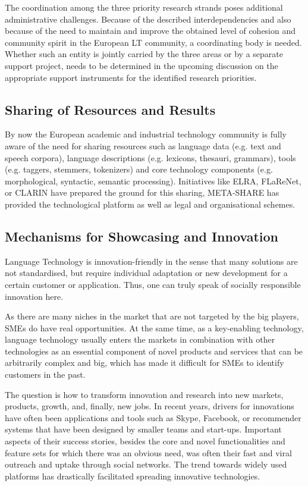 \documentclass[10pt, plain]{../../metanetpaper}
\begin{document}
\begin{multicols}{2}
The coordination among the three priority research strands poses additional administrative challenges. Because of the described interdependencies and also because of the need to maintain and improve the obtained level of cohesion and community spirit in the European LT community, a coordinating body is needed. Whether such an entity is jointly carried by the three areas or by a separate support project, needs to be determined in the upcoming discussion on the appropriate support instruments for the identified research priorities.

\subsection{Sharing of Resources and Results}
\label{sec:sharing-resources-and-results}

By now the European academic and industrial technology community is fully aware of the need for sharing resources such as language data (e.g. text and speech corpora), language descriptions (e.g. lexicons, thesauri, grammars), tools (e.g. taggers, stemmers, tokenizers) and core technology components (e.g. morphological, syntactic, semantic processing). Initiatives like ELRA, FLaReNet, or CLARIN have prepared the ground for this sharing, META-SHARE has provided the technological platform as well as legal and organisational schemes.


\subsection{Mechanisms for Showcasing and Innovation}
\label{sec:powerf-mech-showcasing-and-innovation}

Language Technology is innovation-friendly in the sense that many solutions are not standardised, but require individual adaptation or new development for a certain customer or application. Thus, one can truly speak of socially responsible innovation here.

As there are many niches in the market that are not targeted by the big players, SMEs do have real opportunities. At the same time, as a key-enabling technology, language technology usually enters the markets in combination with other technologies as an essential component of novel products and services that can be arbitrarily complex and big, which has made it difficult for SMEs to identify customers in the past.    

The question is how to transform innovation and research into new markets, products, growth, and, finally, new jobs. In recent years, drivers for innovations have often been applications and tools such as Skype, Facebook, or recommender systems that have been designed by smaller teams and start-ups. Important aspects of their success stories, besides the core and novel functionalities and feature sets for which there was an obvious need, was often their fast and viral outreach and uptake through social networks. The trend towards widely used platforms has drastically facilitated spreading innovative technologies.


\end{multicols}
\end{document}
